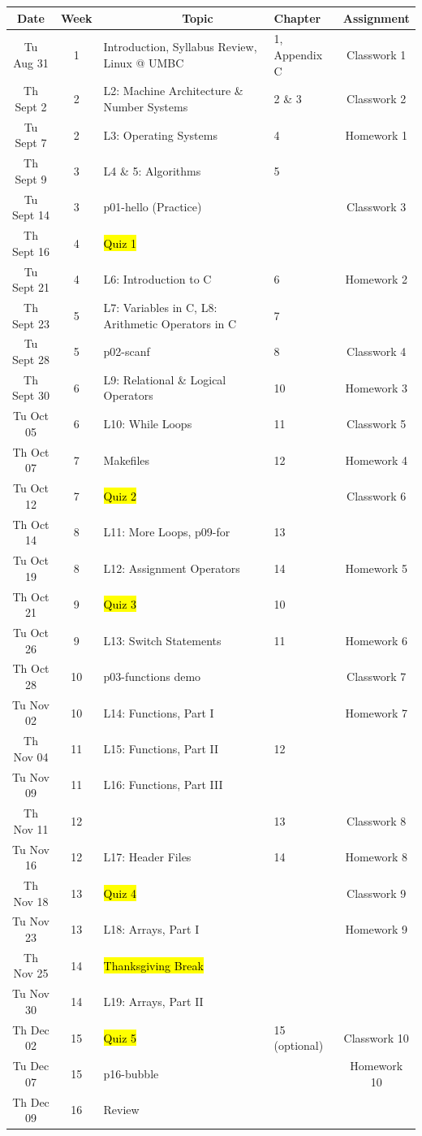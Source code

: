 \documentclass[letter,11pt]{article}
\begin{document}
\small
\begin{tabular}{c c l l c}
Date & Week & ~~~~~~~~~~~~Topic & Chapter & Assignment \\
\hline
Tu Aug 31  & 1 & Introduction, Syllabus Review, Linux @ UMBC & 1, Appendix C & Classwork 1  \\ \hline
Th Sept 2  & 2 & L2: Machine Architecture \& Number Systems & 2 \& 3 & Classwork 2 \\
Tu Sept 7  & 2 & L3: Operating Systems & 4 & Homework 1 \\
Th Sept 9  & 3 & L4 \& 5: Algorithms & 5 & \\
Tu Sept 14 & 3 & p01-hello (Practice) & & Classwork 3  \\
Th Sept 16 & 4 & \hl{Quiz 1} & &  \\
Tu Sept 21 & 4 & L6: Introduction to C & 6 & Homework 2 \\
Th Sept 23 & 5 & L7: Variables in C, L8: Arithmetic Operators in C & 7 \\
Tu Sept 28 & 5 & p02-scanf & 8 & Classwork 4 \\
Th Sept 30 & 6 & L9: Relational \& Logical Operators & 10 & Homework 3 \\ \hline
Tu Oct 05 & 6 & L10: While Loops & 11 & Classwork 5 \\
Th Oct 07 & 7 & Makefiles & 12 & Homework 4 \\
Tu Oct 12 & 7 & \hl{Quiz 2} & & Classwork 6 \\
Th Oct 14 & 8 & L11: More Loops, p09-for & 13 & \\
Tu Oct 19 & 8 & L12: Assignment Operators & 14 & Homework 5 \\
Th Oct 21 & 9 & \hl{Quiz 3} & 10 \\
Tu Oct 26 & 9 & L13: Switch Statements & 11 & Homework 6 \\
Th Oct 28 & 10 & p03-functions demo   & & Classwork 7 \\ \hline
Tu Nov 02 & 10 & L14: Functions, Part I   & & Homework 7\\
Th Nov 04 & 11 & L15: Functions, Part II  & 12 \\
Tu Nov 09 & 11 & L16: Functions, Part III & &  \\
Th Nov 11 & 12 &  & 13 & Classwork 8 \\
Tu Nov 16 & 12 & L17: Header Files & 14 & Homework 8 \\
Th Nov 18 & 13 & \hl{Quiz 4} & & Classwork 9 \\
Tu Nov 23 & 13 & L18: Arrays, Part I & & Homework 9\\
Th Nov 25 & 14 & \hl{Thanksgiving Break} &  & \\
Tu Nov 30 & 14 & L19: Arrays, Part II &  \\ \hline
Th Dec 02 & 15 & \hl{Quiz 5} & 15 (optional) & Classwork 10 \\
Tu Dec 07 & 15 & p16-bubble & & Homework 10 \\
Th Dec 09 & 16 & Review &  \\
\end{tabular}
\end{document}

